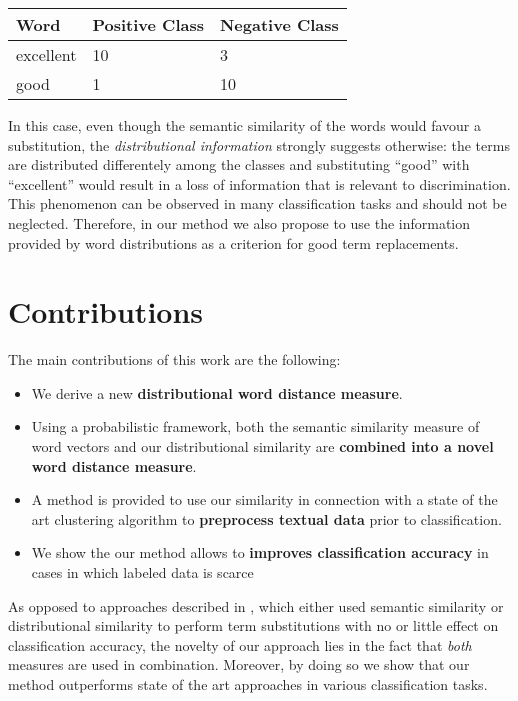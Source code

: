\begin{center}
\begin{tabular}{l|l|l}
\textbf{Word} & \textbf{Positive Class} & \textbf{Negative Class}  \\
\hline
excellent & 10 & 3 \\
good & 1 & 10 \\
\end{tabular}
\end{center}

In this case, even though the semantic similarity of the words would favour a
substitution, the \emph{distributional information} strongly suggests otherwise:
the terms are distributed differentely among the classes and substituting ``good'' with
``excellent'' would result in a loss of information that is relevant to 
discrimination. 
This phenomenon can be observed in many classification tasks and
should not be neglected. Therefore, in our method we also propose to use 
the information provided by word distributions as a criterion for good term 
replacements. 

\section{Contributions}
\label{sec:contributions}
The main contributions of this work are the following:

\begin{itemize}
  \item We derive a new \textbf{distributional word distance measure}.
   
  \item Using a probabilistic framework, both the semantic similarity
  measure of word vectors and our distributional similarity are \textbf{combined into a novel
  word distance measure}.
  
  \item A method is provided to use our similarity in connection with a state of
  the art clustering algorithm to \textbf{preprocess textual data} prior to
  classification.

  \item We show the our method allows to \textbf{improves classification
  accuracy} in cases in which labeled data is scarce
\end{itemize}

As opposed to approaches described in \cite{wang2016semantic,
baker1998distributional}, which either used semantic similarity or distributional similarity 
to perform term substitutions with no or little effect on classification
accuracy, the novelty of our approach lies in the fact that \emph{both} measures
are used in combination. Moreover, by doing so we show that our method
outperforms state of the art approaches in various classification tasks. 


